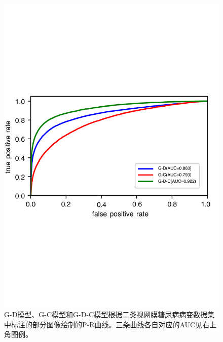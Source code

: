 \begin{figure}[h]
	\centering
	\includegraphics[width=1.0\textwidth]{figure/ROC_u_d_u_c_u_d_c_components}
	\caption{G-D模型、G-C模型和G-D-C模型根据二类视网膜糖尿病病变数据集中标注的部分图像绘制的P-R曲线。三条曲线各自对应的AUC见右上角图例。} 
	\label{fig:roc_u_d_u_c_u_d_c_components}
\end{figure}

\endinput

